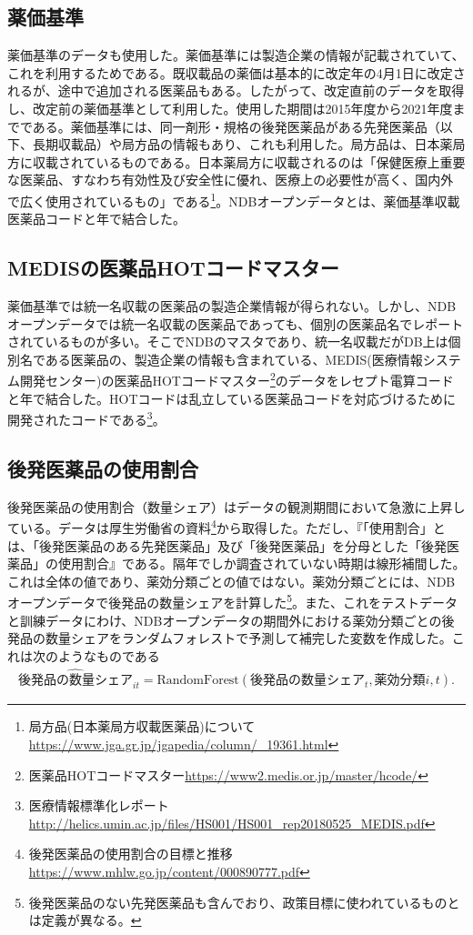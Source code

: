 \documentclass[a4paper,11pt,uplatex]{jsarticle}
\theoremstyle{definition}
\begin{document}
\subsection{薬価基準}
薬価基準のデータも使用した。薬価基準には製造企業の情報が記載されていて、これを利用するためである。既収載品の薬価は基本的に改定年の4月1日に改定されるが、途中で追加される医薬品もある。したがって、改定直前のデータを取得し、改定前の薬価基準として利用した。使用した期間は2015年度から2021年度までである。薬価基準には、同一剤形・規格の後発医薬品がある先発医薬品（以下、長期収載品）や局方品の情報もあり、これも利用した。局方品は、日本薬局方に収載されているものである。日本薬局方に収載されるのは「保健医療上重要な医薬品、すなわち有効性及び安全性に優れ、医療上の必要性が高く、国内外で広く使用されているもの」である\footnote{局方品(日本薬局方収載医薬品)について\url{https://www.jga.gr.jp/jgapedia/column/_19361.html}}。NDBオープンデータとは、薬価基準収載医薬品コードと年で結合した。 
\subsection{MEDISの医薬品HOTコードマスター}
薬価基準では統一名収載の医薬品の製造企業情報が得られない。しかし、NDBオープンデータでは統一名収載の医薬品であっても、個別の医薬品名でレポートされているものが多い。そこでNDBのマスタであり、統一名収載だがDB上は個別名である医薬品の、製造企業の情報も含まれている、MEDIS(医療情報システム開発センター)の医薬品HOTコードマスター\footnote{医薬品HOTコードマスター\url{https://www2.medis.or.jp/master/hcode/}}のデータをレセプト電算コードと年で結合した。HOTコードは乱立している医薬品コードを対応づけるために開発されたコードである\footnote{医療情報標準化レポート\url{http://helics.umin.ac.jp/files/HS001/HS001_rep20180525_MEDIS.pdf}}。
\subsection{後発医薬品の使用割合}
後発医薬品の使用割合（数量シェア）はデータの観測期間において急激に上昇している。データは厚生労働省の資料\footnote{後発医薬品の使用割合の目標と推移\url{https://www.mhlw.go.jp/content/000890777.pdf}}から取得した。ただし、『「使用割合」とは、「後発医薬品のある先発医薬品」及び「後発医薬品」を分母とした「後発医薬品」の使用割合』である。隔年でしか調査されていない時期は線形補間した。これは全体の値であり、薬効分類ごとの値ではない。薬効分類ごとには、NDBオープンデータで後発品の数量シェアを計算した\footnote{後発医薬品のない先発医薬品も含んでおり、政策目標に使われているものとは定義が異なる。}。また、これをテストデータと訓練データにわけ、NDBオープンデータの期間外における薬効分類ごとの後発品の数量シェアをランダムフォレストで予測して補完した変数を作成した。これは次のようなものである
\begin{align*}
\widehat {後発品の数量シェア}_{it}= \textrm{RandomForest}(後発品の数量シェア_t,薬効分類i,t).
\end{align*}
\end{document}
